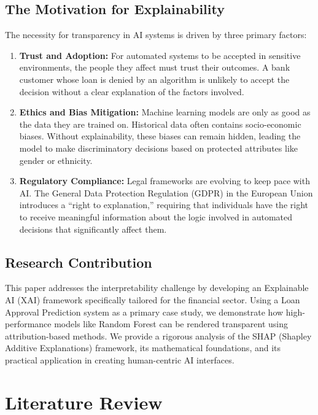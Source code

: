 \documentclass[12pt, a4paper]{article}
\begin{document}
\subsection{The Motivation for Explainability}

The necessity for transparency in AI systems is driven by three primary factors:

\begin{enumerate}[label=\alph*)]
    \item \textbf{Trust and Adoption:} For automated systems to be accepted in sensitive environments, the people they affect must trust their outcomes. A bank customer whose loan is denied by an algorithm is unlikely to accept the decision without a clear explanation of the factors involved.
    \item \textbf{Ethics and Bias Mitigation:} Machine learning models are only as good as the data they are trained on. Historical data often contains socio-economic biases. Without explainability, these biases can remain hidden, leading the model to make discriminatory decisions based on protected attributes like gender or ethnicity.
    \item \textbf{Regulatory Compliance:} Legal frameworks are evolving to keep pace with AI. The General Data Protection Regulation (GDPR) in the European Union introduces a ``right to explanation,'' requiring that individuals have the right to receive meaningful information about the logic involved in automated decisions that significantly affect them.
\end{enumerate}

\subsection{Research Contribution}

This paper addresses the interpretability challenge by developing an Explainable AI (XAI) framework specifically tailored for the financial sector. Using a Loan Approval Prediction system as a primary case study, we demonstrate how high-performance models like Random Forest can be rendered transparent using attribution-based methods. We provide a rigorous analysis of the SHAP (Shapley Additive Explanations) framework, its mathematical foundations, and its practical application in creating human-centric AI interfaces.

\section{Literature Review}
\end{document}
